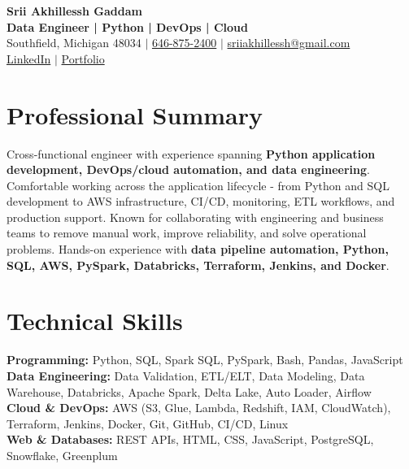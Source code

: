 \documentclass[letterpaper,10pt]{article}
\begin{document}
\fontsize{9.35pt}{10.45pt}\selectfont

\begin{center}
    {\LARGE \textbf{Srii Akhillessh Gaddam}} \\[-1pt]
    \textbf{Data Engineer | Python | DevOps | Cloud} \\[2pt]
    Southfield, Michigan 48034 $|$
    \href{tel:6468752400}{646-875-2400} $|$
    \href{mailto:sriiakhillessh@gmail.com}{sriiakhillessh@gmail.com} \\[1pt]
    \href{https://www.linkedin.com/in/srii-akhiilessh-gaddam-b48668191/}{LinkedIn} $|$
    \href{https://sriiakhillesshg.github.io/portfolio/}{Portfolio}
\end{center}
\vspace{-8pt}

\section{Professional Summary}
\small{Cross-functional engineer with experience spanning \textbf{Python application development, DevOps/cloud automation, and data engineering}. Comfortable working across the application lifecycle - from Python and SQL development to AWS infrastructure, CI/CD, monitoring, ETL workflows, and production support. Known for collaborating with engineering and business teams to remove manual work, improve reliability, and solve operational problems. Hands-on experience with \textbf{data pipeline automation, Python, SQL, AWS, PySpark, Databricks, Terraform, Jenkins, and Docker}.}

\section{Technical Skills}
\small{
\textbf{Programming:} Python, SQL, Spark SQL, PySpark, Bash, Pandas, JavaScript \\
\textbf{Data Engineering:} Data Validation, ETL/ELT, Data Modeling, Data Warehouse, Databricks, Apache Spark, Delta Lake, Auto Loader, Airflow \\
\textbf{Cloud \& DevOps:} AWS (S3, Glue, Lambda, Redshift, IAM, CloudWatch), Terraform, Jenkins, Docker, Git, GitHub, CI/CD, Linux \\
\textbf{Web \& Databases:} REST APIs, HTML, CSS, JavaScript, PostgreSQL, Snowflake, Greenplum
}
\end{document}
